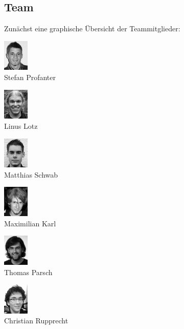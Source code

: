 \documentclass[12pt,a4paper]{article}
\begin{document}
\subsection{Team}
Zunächst eine graphische Übersicht der Teammitglieder:\\
\begin{multicols}{2}{
\begin{list}{ }
	\item    \includegraphics[height=1.5cm]{./face_Fanter.png}     \\      Stefan Profanter	
	\item    \includegraphics[height=1.5cm]{./face_Lotz.png}       \\      Linus Lotz 
	\item    \includegraphics[height=1.5cm]{./face_Matthias.png}   \\      Matthias Schwab	
	\item    \includegraphics[height=1.5cm]{./face_Maxikay.png}    \\      Maximilian Karl
	\item    \includegraphics[height=1.5cm]{./face_Parsch.png}     \\      Thomas Parsch		
	\item 	\includegraphics[height=1.5cm]{./face_Rupprecht.png}   \\      Christian Rupprecht

\end{list}}
\end{multicols}
\end{document}
